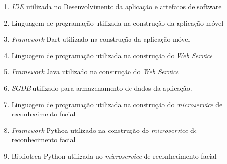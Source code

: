\begin{enumerate}
    \item \textit{IDE} utilizada no Desenvolvimento da aplicação e artefatos de software
    \item Linguagem de programação utilizada na construção da aplicação móvel
    \item \textit{Framework} Dart utilizado na construção da aplicação móvel
    \item Linguagem de programação utilizada na construção do \textit{Web Service}
    \item \textit{Framework} Java utilizado na construção do \textit{Web Service}
    \item \textit{SGDB} utilizado para armazenamento de dados da aplicação.
    \item Linguagem de programação utilizada na construção do \textit{microservice} de reconhecimento facial
    \item \textit{Framework} Python utilizado na construção do \textit{microservice} de reconhecimento facial
    \item Biblioteca Python utilizada no \textit{microservice} de reconhecimento facial
\end{enumerate}
